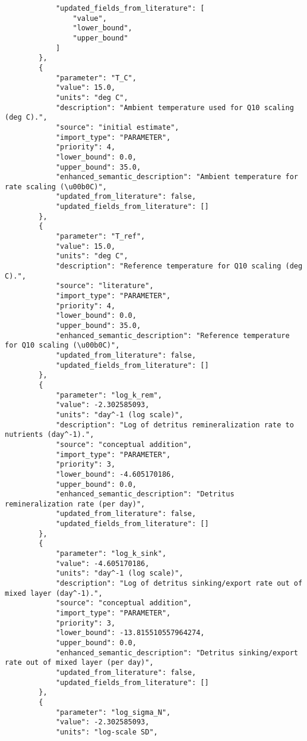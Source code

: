 \begin{lstlisting}
            "updated_fields_from_literature": [
                "value",
                "lower_bound",
                "upper_bound"
            ]
        },
        {
            "parameter": "T_C",
            "value": 15.0,
            "units": "deg C",
            "description": "Ambient temperature used for Q10 scaling (deg C).",
            "source": "initial estimate",
            "import_type": "PARAMETER",
            "priority": 4,
            "lower_bound": 0.0,
            "upper_bound": 35.0,
            "enhanced_semantic_description": "Ambient temperature for rate scaling (\u00b0C)",
            "updated_from_literature": false,
            "updated_fields_from_literature": []
        },
        {
            "parameter": "T_ref",
            "value": 15.0,
            "units": "deg C",
            "description": "Reference temperature for Q10 scaling (deg C).",
            "source": "literature",
            "import_type": "PARAMETER",
            "priority": 4,
            "lower_bound": 0.0,
            "upper_bound": 35.0,
            "enhanced_semantic_description": "Reference temperature for Q10 scaling (\u00b0C)",
            "updated_from_literature": false,
            "updated_fields_from_literature": []
        },
        {
            "parameter": "log_k_rem",
            "value": -2.302585093,
            "units": "day^-1 (log scale)",
            "description": "Log of detritus remineralization rate to nutrients (day^-1).",
            "source": "conceptual addition",
            "import_type": "PARAMETER",
            "priority": 3,
            "lower_bound": -4.605170186,
            "upper_bound": 0.0,
            "enhanced_semantic_description": "Detritus remineralization rate (per day)",
            "updated_from_literature": false,
            "updated_fields_from_literature": []
        },
        {
            "parameter": "log_k_sink",
            "value": -4.605170186,
            "units": "day^-1 (log scale)",
            "description": "Log of detritus sinking/export rate out of mixed layer (day^-1).",
            "source": "conceptual addition",
            "import_type": "PARAMETER",
            "priority": 3,
            "lower_bound": -13.815510557964274,
            "upper_bound": 0.0,
            "enhanced_semantic_description": "Detritus sinking/export rate out of mixed layer (per day)",
            "updated_from_literature": false,
            "updated_fields_from_literature": []
        },
        {
            "parameter": "log_sigma_N",
            "value": -2.302585093,
            "units": "log-scale SD",

\end{lstlisting}
